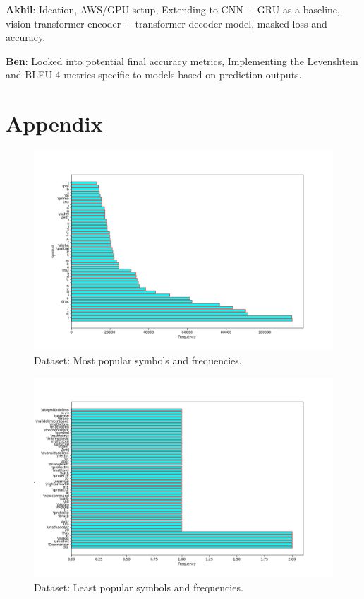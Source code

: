 \documentclass{article}
\begin{document}
\textbf{Akhil}: Ideation, AWS/GPU setup, Extending to CNN + GRU as a baseline, vision transformer encoder + transformer decoder model, masked loss and accuracy.

\textbf{Ben}: Looked into potential final accuracy metrics, Implementing the Levenshtein and BLEU-4 metrics specific to models based on  prediction outputs.

\medskip

\nocite{*}


\section{Appendix}

\begin{figure}[H]
    \centering
    \includegraphics[scale=0.4]{fig_vocabs_frequency_1.png}
    \caption{Dataset: Most popular symbols and frequencies.}
    \label{fig:vocab_freq_1}
\end{figure}

\begin{figure}[H]
    \centering
    \includegraphics[scale=0.4]{fig_vocabs_frequency_2.png}
    \caption{Dataset: Least popular symbols and frequencies.}
    \label{fig:vocab_freq_2}
\end{figure}
\end{document}
